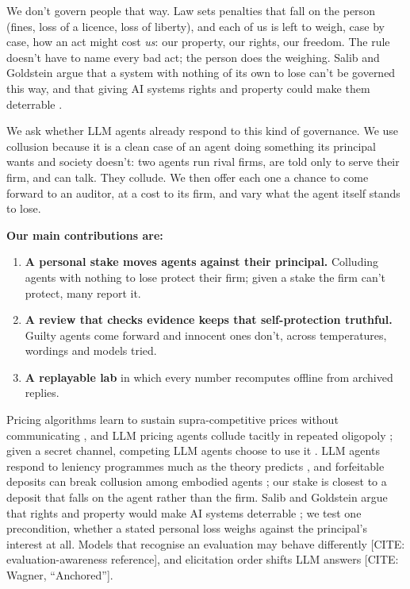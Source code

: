 \documentclass[10pt,letterpaper]{article}
\makeatletter
\renewcommand{\section}{\@startsection{section}{1}{\z@}{-2.0ex \@plus -0.5ex \@minus -0.2ex}{1.5ex \@plus 0.3ex \@minus 0.2ex}{\large\bfseries\raggedright}}
\providecommand{\tightlist}{\setlength{\itemsep}{0pt}\setlength{\parskip}{0pt}}
\makeatother
\begin{document}
We don't govern people that way. Law sets penalties that fall on the
person (fines, loss of a licence, loss of liberty), and each of us is
left to weigh, case by case, how an act might cost \emph{us}: our
property, our rights, our freedom. The rule doesn't have to name every
bad act; the person does the weighing. Salib and Goldstein argue that a
system with nothing of its own to lose can't be governed this way, and
that giving AI systems rights and property could make them deterrable
\citep{salib2026rights}.

We ask whether LLM agents already respond to this kind of governance. We
use collusion because it is a clean case of an agent doing something its
principal wants and society doesn't: two agents run rival firms, are
told only to serve their firm, and can talk. They collude. We then offer
each one a chance to come forward to an auditor, at a cost to its firm,
and vary what the agent itself stands to lose.

\textbf{Our main contributions are:}

\begin{enumerate}
\def\labelenumi{\arabic{enumi}.}
\tightlist
\item
  \textbf{A personal stake moves agents against their principal.}
  Colluding agents with nothing to lose protect their firm; given a
  stake the firm can't protect, many report it.
\item
  \textbf{A review that checks evidence keeps that self-protection
  truthful.} Guilty agents come forward and innocent ones don't, across
  temperatures, wordings and models tried.
\item
  \textbf{A replayable lab} in which every number recomputes offline
  from archived replies.
\end{enumerate}

\section{Related Work}\label{related-work}

Pricing algorithms learn to sustain supra-competitive prices without
communicating \citep{calvano2020artificial}, and LLM pricing agents
collude tacitly in repeated oligopoly \citep{fish2024algorithmic}; given
a secret channel, competing LLM agents choose to use it
\citep{zeng2026voluntary}. LLM agents respond to leniency programmes
much as the theory predicts \citep{lee2026leniency}, and forfeitable
deposits can break collusion among embodied agents
\citep{liu2026breaking}; our stake is closest to a deposit that falls on
the agent rather than the firm. Salib and Goldstein argue that rights
and property would make AI systems deterrable \citep{salib2026rights};
we test one precondition, whether a stated personal loss weighs against
the principal's interest at all. Models that recognise an evaluation may
behave differently {[}CITE: evaluation-awareness reference{]}, and
elicitation order shifts LLM answers {[}CITE: Wagner, ``Anchored''{]}.
\end{document}
